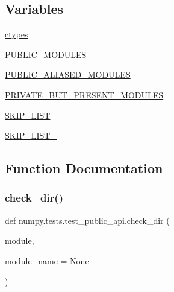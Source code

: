 \subsection*{Variables}
\begin{DoxyCompactItemize}
\item 
\hyperlink{namespacenumpy_1_1tests_1_1test__public__api_a98819d5ac503e24ca67716c34e884c5c}{ctypes}
\item 
\hyperlink{namespacenumpy_1_1tests_1_1test__public__api_ac6664c75a71e606565f658d28923eee8}{P\+U\+B\+L\+I\+C\+\_\+\+M\+O\+D\+U\+L\+ES}
\item 
\hyperlink{namespacenumpy_1_1tests_1_1test__public__api_aa9879c2410c3ec29a4c4e67e18c5fb0a}{P\+U\+B\+L\+I\+C\+\_\+\+A\+L\+I\+A\+S\+E\+D\+\_\+\+M\+O\+D\+U\+L\+ES}
\item 
\hyperlink{namespacenumpy_1_1tests_1_1test__public__api_abd15cfc77ece341d7bd4d8fec232b480}{P\+R\+I\+V\+A\+T\+E\+\_\+\+B\+U\+T\+\_\+\+P\+R\+E\+S\+E\+N\+T\+\_\+\+M\+O\+D\+U\+L\+ES}
\item 
\hyperlink{namespacenumpy_1_1tests_1_1test__public__api_ac4a4e5d77c34d09e3e9d76544c8efa53}{S\+K\+I\+P\+\_\+\+L\+I\+ST}
\item 
\hyperlink{namespacenumpy_1_1tests_1_1test__public__api_a2de3eaa73302ac40887edef2b9962712}{S\+K\+I\+P\+\_\+\+L\+I\+S\+T\+\_}
\end{DoxyCompactItemize}


\subsection{Function Documentation}
\mbox{\label{namespacenumpy_1_1tests_1_1test__public__api_aca631c7663d90d8e193fa102fb283d21}} 
\subsubsection{\texorpdfstring{check\+\_\+dir()}{check\_dir()}}
{\footnotesize\ttfamily def numpy.\+tests.\+test\+\_\+public\+\_\+api.\+check\+\_\+dir (\begin{DoxyParamCaption}\item[{}]{module,  }\item[{}]{module\+\_\+name = {\ttfamily None} }\end{DoxyParamCaption})}

